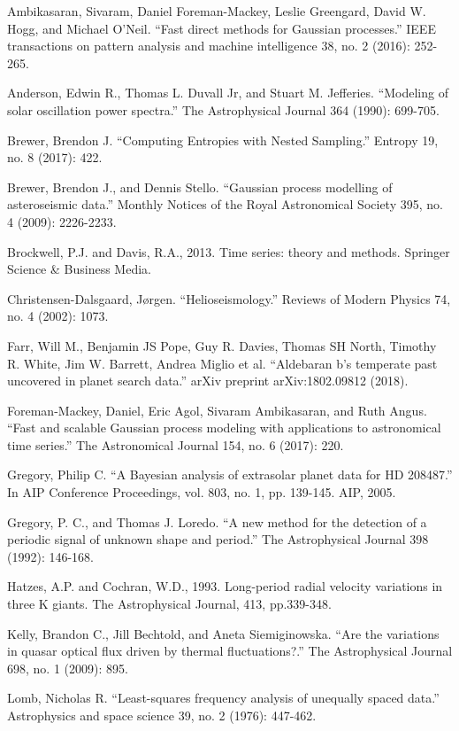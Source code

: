 \documentclass[a4paper, 12pt]{article}
\begin{document}
\begin{thebibliography}{999}

Ambikasaran, Sivaram, Daniel Foreman-Mackey, Leslie Greengard, David W. Hogg, and Michael O’Neil. ``Fast direct methods for Gaussian processes.''
IEEE transactions on pattern analysis and machine intelligence 38, no. 2 (2016): 252-265.

Anderson, Edwin R., Thomas L. Duvall Jr, and Stuart M. Jefferies. ``Modeling of solar oscillation power spectra.'' The Astrophysical Journal 364 (1990): 699-705.

Brewer, Brendon J. ``Computing Entropies with Nested Sampling.'' Entropy 19, no. 8 (2017): 422.

Brewer, Brendon J., and Dennis Stello. ``Gaussian process modelling of asteroseismic data.'' Monthly Notices of the Royal Astronomical Society 395, no. 4 
(2009): 2226-2233.

Brockwell, P.J. and Davis, R.A., 2013. Time series: theory and methods. Springer Science \& Business Media.

Christensen-Dalsgaard, Jørgen. ``Helioseismology.'' Reviews of Modern Physics 74, no. 4 (2002): 1073.

Farr, Will M., Benjamin JS Pope, Guy R. Davies, Thomas SH North, Timothy R. White, Jim W. Barrett, Andrea Miglio et al. ``Aldebaran b's temperate past uncovered in planet search data.'' arXiv preprint arXiv:1802.09812 (2018).

Foreman-Mackey, Daniel, Eric Agol, Sivaram Ambikasaran, and Ruth Angus. ``Fast and scalable Gaussian process modeling with applications to astronomical time series.'' The Astronomical Journal 154, no. 6 (2017): 220.

Gregory, Philip C.
``A Bayesian analysis of extrasolar planet data for HD 208487.''
In AIP Conference Proceedings, vol. 803, no. 1, pp. 139-145. AIP, 2005.

Gregory, P. C., and Thomas J. Loredo. ``A new method for the detection of a periodic signal of unknown shape and period.'' The Astrophysical Journal 398 (1992): 146-168.

Hatzes, A.P. and Cochran, W.D., 1993. Long-period radial velocity variations in three K giants. The Astrophysical Journal, 413, pp.339-348.

Kelly, Brandon C., Jill Bechtold, and Aneta Siemiginowska. ``Are the variations in quasar optical flux driven by thermal fluctuations?.'' The Astrophysical Journal 698, no. 1 (2009): 895.

Lomb, Nicholas R. ``Least-squares frequency analysis of unequally spaced data.'' Astrophysics and space science 39, no. 2 (1976): 447-462.

\end{thebibliography}
\end{document}
